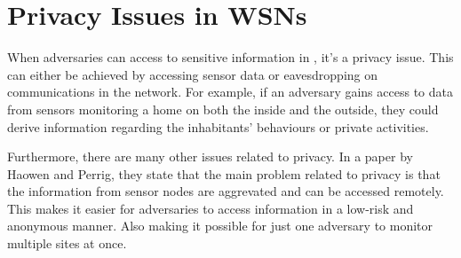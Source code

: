 




\section{Privacy Issues in WSNs}



When adversaries can access to sensitive information in \wsn, it's a privacy issue. This can either be achieved by accessing sensor data or eavesdropping on communications in the network. For example, if an adversary gains access to data from sensors monitoring a home on both the inside and the outside, they could derive information regarding the inhabitants' behaviours or private activities. 



Furthermore, there are many other issues related to privacy. In a paper by Haowen and Perrig\cite{chan2003security}, they state that the main problem related to privacy is that the information from sensor nodes are aggrevated and can be accessed remotely. This makes it easier for adversaries to access information in a low-risk and anonymous manner. Also making it possible for just one adversary to monitor multiple sites at once. 



